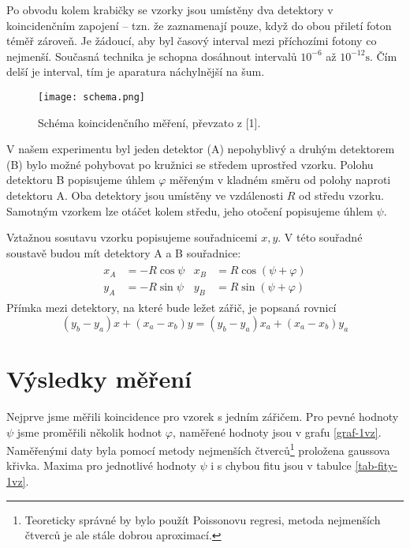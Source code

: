 \documentclass[10pt,a4paper]{article}
\renewcommand{\U}[1]{\ensuremath{\mathrm{#1}}}
\begin{document}
Po obvodu kolem krabičky se vzorky jsou umístěny dva detektory v koincidenčním zapojení – tzn. že zaznamenají pouze, když do obou přiletí foton téměř zároveň. Je žádoucí, aby byl časový interval mezi příchozími fotony co nejmenší. Současná technika je schopna dosáhnout intervalů $10^{-6}$ až $10^{-12} \U{s}$. \cite{studijni-text} Čím delší je interval, tím je aparatura náchylnější na šum.

\begin{figure}[h]
    \centering
    \texttt{[image: schema.png]}
    \caption{Schéma koincidenčního měření, převzato z [1].}
\end{figure}

V našem experimentu byl jeden detektor (A) nepohyblivý a druhým detektorem (B) bylo možné pohybovat po kružnici se středem uprostřed vzorku. Polohu detektoru B popisujeme úhlem $\varphi$ měřeným v kladném směru od polohy naproti detektoru A. Oba detektory jsou umístěny ve vzdálenosti $R$ od středu vzorku. Samotným vzorkem lze otáčet kolem středu, jeho otočení popisujeme úhlem $\psi$.

Vztažnou sosutavu vzorku popisujeme souřadnicemi $x, y$. V této souřadné soustavě budou mít detektory A a B souřadnice:
\begin{gather}
    \begin{aligned}
        x_A &= -R \cos \psi & x_B &= R \cos(\psi + \varphi)\\
        y_A &= -R \sin \psi & y_B &= R \sin(\psi + \varphi)
    \end{aligned}
    \label{detektory-xy}
\end{gather}
Přímka mezi detektory, na které bude ležet zářič, je popsaná rovnicí
\begin{equation}
    (y_b - y_a)x + (x_a - x_b)y = (y_b - y_a)x_a + (x_a - x_b)y_a
    \label{primka-xy}
\end{equation}


\section{Výsledky měření}
Nejprve jsme měřili koincidence pro vzorek s jedním zářičem. Pro pevné hodnoty $\psi$ jsme proměřili několik hodnot $\varphi$, naměřené hodnoty jsou v grafu \ref{graf-1vz}. Naměřenými daty byla pomocí metody nejmenších čtverců\footnote{Teoreticky správné by bylo použít Poissonovu regresi, metoda nejmenších čtverců je ale stále dobrou aproximací.} proložena gaussova křivka. Maxima pro jednotlivé hodnoty $\psi$ i s chybou fitu jsou v tabulce \ref{tab-fity-1vz}.
\end{document}
